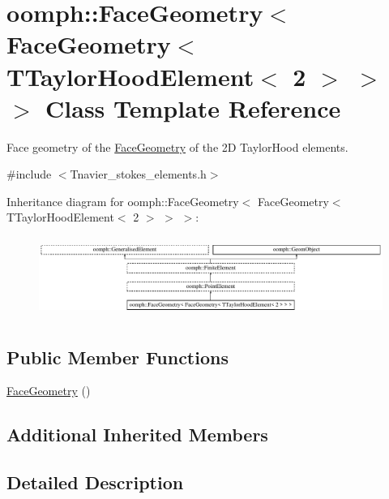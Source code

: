 \hypertarget{classoomph_1_1FaceGeometry_3_01FaceGeometry_3_01TTaylorHoodElement_3_012_01_4_01_4_01_4}{}\section{oomph\+:\+:Face\+Geometry$<$ Face\+Geometry$<$ T\+Taylor\+Hood\+Element$<$ 2 $>$ $>$ $>$ Class Template Reference}
\label{classoomph_1_1FaceGeometry_3_01FaceGeometry_3_01TTaylorHoodElement_3_012_01_4_01_4_01_4}


Face geometry of the \hyperlink{classoomph_1_1FaceGeometry}{Face\+Geometry} of the 2D Taylor\+Hood elements.  




{\ttfamily \#include $<$Tnavier\+\_\+stokes\+\_\+elements.\+h$>$}

Inheritance diagram for oomph\+:\+:Face\+Geometry$<$ Face\+Geometry$<$ T\+Taylor\+Hood\+Element$<$ 2 $>$ $>$ $>$\+:\begin{figure}[H]
\begin{center}
\leavevmode
\includegraphics[height=2.635294cm]{classoomph_1_1FaceGeometry_3_01FaceGeometry_3_01TTaylorHoodElement_3_012_01_4_01_4_01_4}
\end{center}
\end{figure}
\subsection*{Public Member Functions}
\begin{DoxyCompactItemize}
\item 
\hyperlink{classoomph_1_1FaceGeometry_3_01FaceGeometry_3_01TTaylorHoodElement_3_012_01_4_01_4_01_4_abccafc37fc42acc1ed1bf79f52256838}{Face\+Geometry} ()
\end{DoxyCompactItemize}
\subsection*{Additional Inherited Members}


\subsection{Detailed Description}
